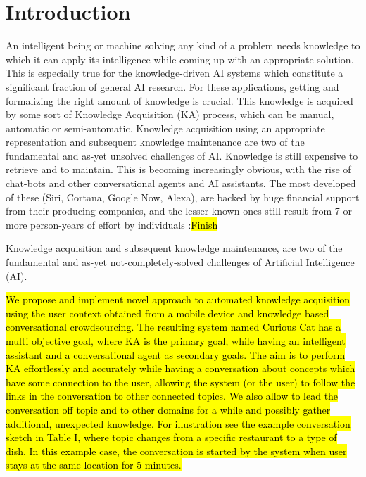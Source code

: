 % 
\chapter{Introduction}
An intelligent being or machine solving any kind of a problem needs knowledge to which it can apply its intelligence while coming up with an appropriate solution. This is especially true for the knowledge-driven AI systems which constitute a significant fraction of general AI research. For these applications, getting and formalizing the right amount of knowledge is crucial. This knowledge is acquired by some sort of Knowledge Acquisition (KA) process, which can be manual, automatic or semi-automatic. Knowledge acquisition using an appropriate representation and subsequent knowledge maintenance are two of the fundamental and as-yet unsolved challenges of AI. Knowledge is still expensive to retrieve and to maintain. This is becoming increasingly obvious, with the rise of chat-bots and other conversational agents and AI assistants. The most developed of these (Siri, Cortana, Google Now, Alexa), are backed by huge financial support from their producing companies, and the lesser-known ones still result from 7 or more person-years of effort by individuals
\todo:{\hl{Finish}}

Knowledge acquisition and subsequent knowledge maintenance, are two of the fundamental and as-yet not-completely-solved challenges of Artificial Intelligence (AI).

\hl{We propose and implement novel approach to automated knowledge acquisition using the user context obtained from a mobile device and knowledge based conversational crowdsourcing. The resulting system named Curious Cat has a multi objective goal, where KA is the primary goal, while having an intelligent assistant and a conversational agent as secondary goals. The aim is to perform KA effortlessly and accurately while having a conversation about concepts which have some connection to the user, allowing the system (or the user) to follow the links in the conversation to other connected topics. We also allow to lead the conversation off topic and to other domains for a while and possibly gather additional, unexpected knowledge. For illustration see the example conversation sketch in Table I, where topic changes from a specific restaurant to a type of dish. In this example case, the conversation is started by the system when user stays at the same location for 5 minutes.}

